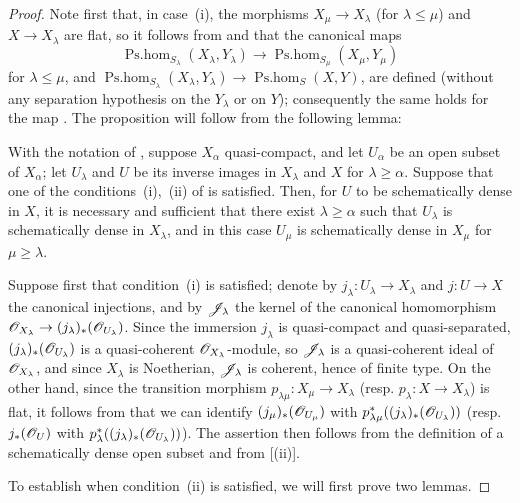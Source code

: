 \begin{proof}
Note first that, in case~(i), the morphisms $X_\mu\to X_\lambda$ (for $\lambda\leq\mu$) and $X\to X_\lambda$ are flat, so it follows from  and  that the canonical maps
\[
  \operatorname{Ps.hom}_{S_\lambda}(X_\lambda,Y_\lambda)\to\operatorname{Ps.hom}_{S_\mu}(X_\mu,Y_\mu)
\]
for $\lambda\leq\mu$, and $\operatorname{Ps.hom}_{S_\lambda}(X_\lambda,Y_\lambda)\to\operatorname{Ps.hom}_S(X,Y)$, are defined (without any separation hypothesis on the $Y_\lambda$ or on $Y$); consequently the same holds for the map .
The proposition will follow from the following lemma:

\begin{lemma}[20.3.8.2]
\label{IV.20.3.8.2}
With the notation of , suppose $X_\alpha$ quasi-compact, and let $U_\alpha$ be an open subset of $X_\alpha$; let $U_\lambda$ and $U$ be its inverse images in $X_\lambda$ and $X$ for $\lambda\geq\alpha$.
Suppose that one of the conditions~(i),~(ii) of  is satisfied.
Then, for $U$ to be schematically dense in $X$, it is necessary and sufficient that there exist $\lambda\geq\alpha$ such that $U_\lambda$ is schematically dense in $X_\lambda$, and in this case $U_\mu$ is schematically dense in $X_\mu$ for $\mu\geq\lambda$.
\end{lemma}

Suppose first that condition~(i) is satisfied; denote by $j_\lambda:U_\lambda\to X_\lambda$ and $j:U\to X$ the canonical injections, and by $\mathscr{J}_\lambda$ the kernel of the canonical homomorphism $\mathscr{O}_{X_\lambda}\to(j_\lambda)_*(\mathscr{O}_{U_\lambda})$.
Since the immersion $j_\lambda$ is quasi-compact and quasi-separated, $(j_\lambda)_*(\mathscr{O}_{U_\lambda})$ is a quasi-coherent $\mathscr{O}_{X_\lambda}$-module, so $\mathscr{J}_\lambda$ is a quasi-coherent ideal of $\mathscr{O}_{X_\lambda}$, and since $X_\lambda$ is Noetherian, $\mathscr{J}_\lambda$ is coherent, hence of finite type.
On the other hand, since the transition morphism $p_{\lambda\mu}:X_\mu\to X_\lambda$ (resp. $p_\lambda:X\to X_\lambda$) is flat, it follows from  that we can identify $(j_\mu)_*(\mathscr{O}_{U_\mu})$ with $p_{\lambda\mu}^*((j_\lambda)_*(\mathscr{O}_{U_\lambda}))$ (resp. $j_*(\mathscr{O}_U)$ with $p_\lambda^*((j_\lambda)_*(\mathscr{O}_{U_\lambda}))$).
The assertion then follows from the definition of a schematically dense open subset and from [(ii)].

To establish  when condition~(ii) is satisfied, we will first prove two lemmas.


\end{proof}
